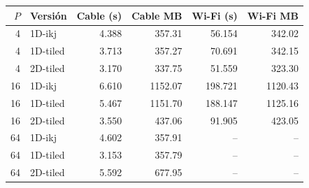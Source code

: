 \begin{center}
\small
\begin{tabular}{rlrrrr}
\toprule
$P$ & Versión & Cable (s) & Cable MB & Wi-Fi (s) & Wi-Fi MB \\
\midrule
4 & 1D-ikj & 4.388 & 357.31 & 56.154 & 342.02 \\
4 & 1D-tiled & 3.713 & 357.27 & 70.691 & 342.15 \\
4 & 2D-tiled & 3.170 & 337.75 & 51.559 & 323.30 \\
16 & 1D-ikj & 6.610 & 1152.07 & 198.721 & 1120.43 \\
16 & 1D-tiled & 5.467 & 1151.70 & 188.147 & 1125.16 \\
16 & 2D-tiled & 3.550 & 437.06 & 91.905 & 423.05 \\
64 & 1D-ikj & 4.602 & 357.91 & -- & -- \\
64 & 1D-tiled & 3.153 & 357.79 & -- & -- \\
64 & 2D-tiled & 5.592 & 677.95 & -- & -- \\
\bottomrule
\end{tabular}
\end{center}
